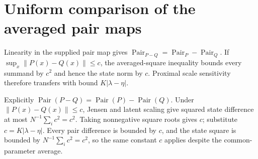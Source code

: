 \documentclass[11pt,a4paper]{article}
\begin{document}
\section{\texorpdfstring{Uniform comparison of the averaged pair maps}{Uniform comparison of the averaged pair maps}}


Linearity in the supplied pair map gives \(\operatorname{Pair}_{P-Q}=\operatorname{Pair}_P-\operatorname{Pair}_Q\). If \(\sup_x\|P(x)-Q(x)\|\le c\), the averaged-square inequality bounds every summand by \(c^2\) and hence the state norm by \(c\). Proximal scale sensitivity therefore transfers with bound \(K|\lambda-\eta|\).



Explicitly \(\operatorname{Pair}(P-Q)=\operatorname{Pair}(P)-\operatorname{Pair}(Q)\). Under \(\|P(x)-Q(x)\|\le c\), Jensen and latent scaling give squared state difference at most \(N^{-1}\sum_i c^2=c^2\). Taking nonnegative square roots gives \(c\); substitute \(c=K|\lambda-\eta|\). Every pair difference is bounded by \(c\), and the state square is bounded by \(N^{-1}\sum_i c^2=c^2\), so the same constant \(c\) applies despite the common-parameter average.
\end{document}
